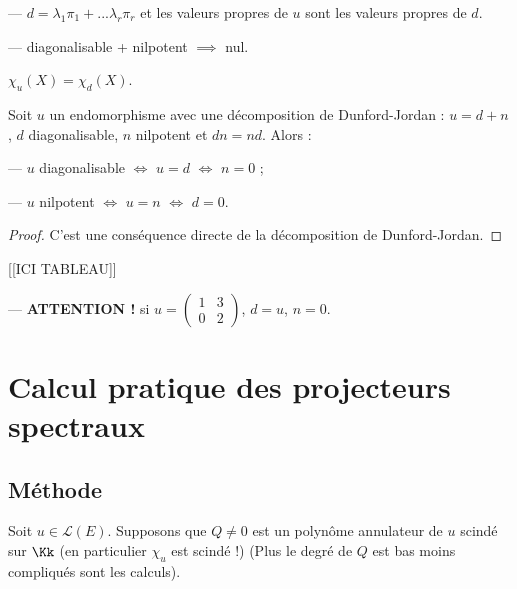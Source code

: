 \documentclass[class=report,crop=false]{standalone}
\begin{document}
--- $d = \lambda_1 \pi_1 + ... \lambda_r \pi_r$ et les valeurs propres de $u$ sont les valeurs propres de $d$.

--- diagonalisable + nilpotent $\implies$ nul.
\begin{exercicecours}
$\chi_u(X)= \chi_d(X)$.
\end{exercicecours}

\begin{proposition}

Soit $u$ un endomorphisme avec une décomposition de Dunford-Jordan : $u= d+n$, $d $ diagonalisable, $n$ nilpotent et $dn=nd$. Alors :

--- $u$ diagonalisable $\iff$ $u=d$ $\iff$ $n=0$ ;

--- $u$ nilpotent $\iff$ $u=n$ $\iff$ $d=0$.
\end{proposition}

\begin{proof}
C'est une conséquence directe de la décomposition de Dunford-Jordan.
\end{proof}

\begin{exemple}


[[ICI TABLEAU]]
%



--- {\bf ATTENTION !} si $u = \left(\begin{array}{cc}
1 & 3\\
0 & 2
\end{array}\right)$, $d = u$, $n =0$.

\end{exemple}

\section{Calcul pratique des projecteurs spectraux}
\subsection{Méthode}
Soit $u \in \mathcal{L}(E)$. Supposons que $Q\ne 0$ est un polynôme annulateur de $u$ scindé sur $\Kk$ (en particulier $\chi_u$ est scindé !) (Plus le degré de $Q$ est bas moins compliqués sont les calculs).
\end{document}
